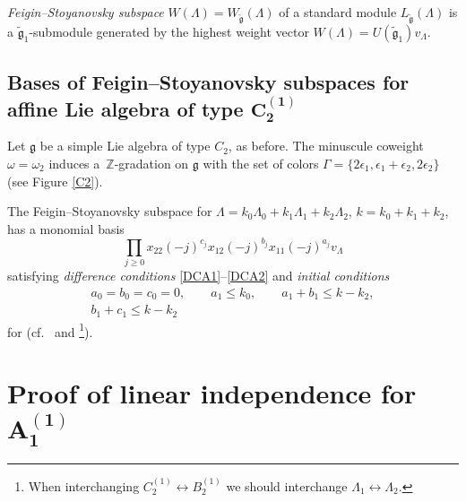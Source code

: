 \documentclass[pdftex]{sigma}
\newcommand{\Z}
{{\mathbb Z}}
\newcommand{\g}
{{\mathfrak g}}
\newcommand{\gt}
{\tilde{{\mathfrak g}}}
\numberwithin{equation}{section}
\begin{document}
{\em Feigin--Stoyanovsky subspace} $W(\Lambda)=W_{\gt}(\Lambda)$ of a standard module $L_{\gt}(\Lambda)$ is a $\gt_1$-submodule generated by the highest weight vector
$W(\Lambda)=U(\gt_1)v_\Lambda$.




\subsection[Bases of Feigin--Stoyanovsky subspaces for affine Lie algebra of type C\_2\^(1)]{Bases of Feigin--Stoyanovsky subspaces for affine Lie algebra of type $\boldsymbol{ C_2^{(1)}}$}

Let $\g$ be a simple Lie algebra of type $C_2$, as before.
The minuscule coweight $\omega=\omega_2$ induces a~$\Z$-gradation on $\g$ with the set of colors $\Gamma = \{2\epsilon_1, \epsilon_1 + \epsilon_2, 2\epsilon_2\}$ (see Figure \ref{C2}).




The Feigin--Stoyanovsky subspace  for $ \Lambda=k_0\Lambda_0+k_1\Lambda_1+k_2\Lambda_2$, $k=k_0+k_1+k_2$, has a monomial basis
\begin{equation} \label{wpi}
\prod_{j\geq 0} x_{2 2}(-j)^{c_j} x_{1 2}(-j)^{b_j} x_{1 1}(-j)^{a_j} v_\Lambda
\end{equation}
satisfying
{\em difference conditions} \eqref{DCA1}--\eqref{DCA2}
and {\em initial conditions}
\begin{gather}
	\label{ICC1} a_0=b_0 =c_0  = 0,\qquad
	a_1 \leq k_0,\qquad
	a_1+b_1\leq k-k_2, \\
	\label{ICC2} b_1+c_1\leq k-k_2
\end{gather}
for  (cf.\ \cite{BPT} and \cite{P}\footnote{When interchanging $C_2^{(1)}\leftrightarrow B_2^{(1)}$ we should interchange $\Lambda_1 \leftrightarrow \Lambda_2$.}).




\section[Proof of linear independence for A\_1\^(1)]{Proof of linear independence for $\boldsymbol{ A_1^{(1)}}$}


\end{document}
